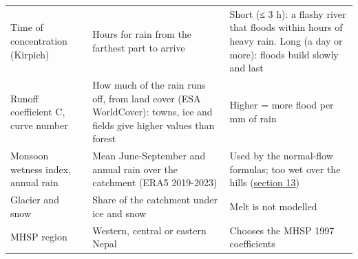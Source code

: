 \documentclass[
  10pt,
]{article}
\begin{document}
\begin{longtable}[]{@{}lll@{}}
\begin{minipage}[t]{0.30\columnwidth}
Time of concentration (Kirpich)\strut
\end{minipage} & \begin{minipage}[t]{0.30\columnwidth}\raggedright
Hours for rain from the farthest part to arrive\strut
\end{minipage} & \begin{minipage}[t]{0.30\columnwidth}\raggedright
Short (≤ 3 h): a flashy river that floods within hours of heavy rain.
Long (a day or more): floods build slowly and last\strut
\end{minipage}\tabularnewline
\begin{minipage}[t]{0.30\columnwidth}\raggedright
Runoff coefficient C, curve number\strut
\end{minipage} & \begin{minipage}[t]{0.30\columnwidth}\raggedright
How much of the rain runs off, from land cover (ESA WorldCover): towns,
ice and fields give higher values than forest\strut
\end{minipage} & \begin{minipage}[t]{0.30\columnwidth}\raggedright
Higher = more flood per mm of rain\strut
\end{minipage}\tabularnewline
\begin{minipage}[t]{0.30\columnwidth}\raggedright
Monsoon wetness index, annual rain\strut
\end{minipage} & \begin{minipage}[t]{0.30\columnwidth}\raggedright
Mean June-September and annual rain over the catchment (ERA5
2019-2023)\strut
\end{minipage} & \begin{minipage}[t]{0.30\columnwidth}\raggedright
Used by the normal-flow formulas; too wet over the hills
(\protect\hyperlink{13-what-the-forecast-cannot-tell-you}{section
13})\strut
\end{minipage}\tabularnewline
\begin{minipage}[t]{0.30\columnwidth}\raggedright
Glacier and snow\strut
\end{minipage} & \begin{minipage}[t]{0.30\columnwidth}\raggedright
Share of the catchment under ice and snow\strut
\end{minipage} & \begin{minipage}[t]{0.30\columnwidth}\raggedright
Melt is not modelled\strut
\end{minipage}\tabularnewline
\begin{minipage}[t]{0.30\columnwidth}\raggedright
MHSP region\strut
\end{minipage} & \begin{minipage}[t]{0.30\columnwidth}\raggedright
Western, central or eastern Nepal\strut
\end{minipage} & \begin{minipage}[t]{0.30\columnwidth}\raggedright
Chooses the MHSP 1997 coefficients\strut
\end{minipage}\tabularnewline
\bottomrule
\end{longtable}
\end{document}
